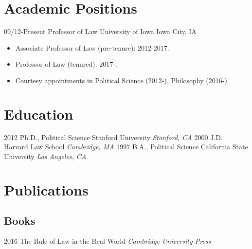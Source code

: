 \documentclass[letterpaper]{moderncv}
\begin{document}
\makecvtitle

\lfoot{\thepage}

%
%
\section{Academic Positions}
\cventry
{09/12-Present}
{Professor of Law}
{University of Iowa}
{Iowa City, IA}
{}
{\begin{itemize}%
	\item Associate Professor of Law (pre-tenure): 2012-2017.
	\item Professor of Law (tenured): 2017-.
	\item Courtesy appointments in Political Science (2012-), Philosophy (2016-)
	\end{itemize}}
%
%
\section{Education}
\cventry
{2012}
{Ph.D., Political Science}
{Stanford University}
{}
{\textit{Stanford, CA}}
{}
\cventry
{2000}
{J.D.}
{Harvard Law School}
{}
{\textit{Cambridge, MA}}
{}
\cventry
{1997}
{B.A., Political Science}
{California State University}
{}
{\textit{Los Angeles, CA}}
{}
%
%
\section{Publications}
\subsection{Books}
\cventry
{2016}
{The Rule of Law in the Real World}
{}
{\textit{Cambridge University Press}}
{}
{}
\vspace{1mm}
\vspace{1mm}
\end{document}
